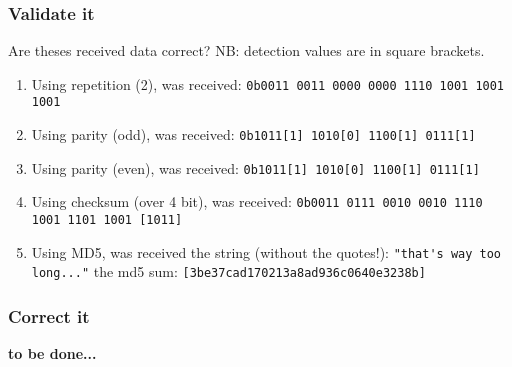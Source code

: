 \documentclass[11pt]{article}
\begin{document}
\subsubsection{Validate it}
Are theses received data correct? NB: detection values are in square brackets.
  \begin{enumerate}
    \item Using repetition (2), was received: \verb$0b0011 0011 0000 0000 1110 1001 1001 1001$
    \item Using parity (odd), was received: \verb$0b1011[1] 1010[0] 1100[1] 0111[1]$
    \item Using parity (even), was received: \verb$0b1011[1] 1010[0] 1100[1] 0111[1]$
    \item Using checksum (over 4 bit), was received: \verb$0b0011 0111 0010 0010 1110 1001 1101 1001 [1011]$
    \item Using MD5, was received the string (without the quotes!): \verb$"that's way too long..."$ the md5 sum: \verb$[3be37cad170213a8ad936c0640e3238b]$
  \end{enumerate}


\subsubsection{Correct it}
\textbf{to be done...}
\end{document}

